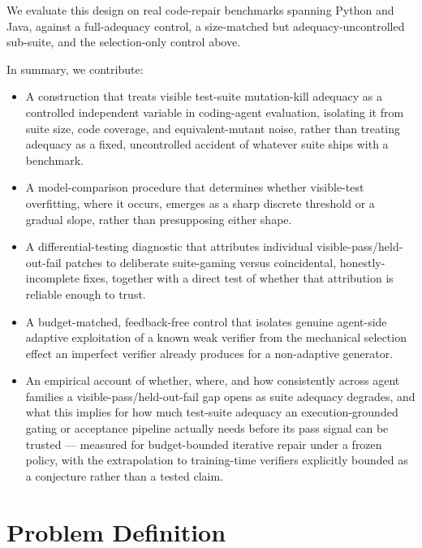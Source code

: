 \documentclass[11pt]{article}
\begin{document}
We evaluate this design on real code-repair benchmarks spanning Python and Java, against a full-adequacy control, a size-matched but adequacy-uncontrolled sub-suite, and the selection-only control above.

In summary, we contribute:
\begin{itemize}[leftmargin=1.4em]
\item A construction that treats visible test-suite mutation-kill adequacy as a controlled independent variable in coding-agent evaluation, isolating it from suite size, code coverage, and equivalent-mutant noise, rather than treating adequacy as a fixed, uncontrolled accident of whatever suite ships with a benchmark.
\item A model-comparison procedure that determines whether visible-test overfitting, where it occurs, emerges as a sharp discrete threshold or a gradual slope, rather than presupposing either shape.
\item A differential-testing diagnostic that attributes individual visible-pass/held-out-fail patches to deliberate suite-gaming versus coincidental, honestly-incomplete fixes, together with a direct test of whether that attribution is reliable enough to trust.
\item A budget-matched, feedback-free control that isolates genuine agent-side adaptive exploitation of a known weak verifier from the mechanical selection effect an imperfect verifier already produces for a non-adaptive generator.
\item An empirical account of whether, where, and how consistently across agent families a visible-pass/held-out-fail gap opens as suite adequacy degrades, and what this implies for how much test-suite adequacy an execution-grounded gating or acceptance pipeline actually needs before its pass signal can be trusted --- measured for budget-bounded iterative repair under a frozen policy, with the extrapolation to training-time verifiers explicitly bounded as a conjecture rather than a tested claim.
\end{itemize}

\section{Problem Definition}
\end{document}

